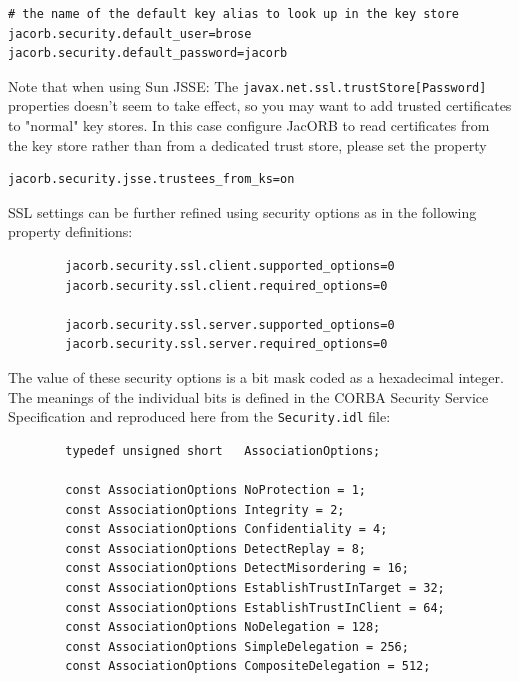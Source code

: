 \begin{verbatim}
# the name of the default key alias to look up in the key store
jacorb.security.default_user=brose
jacorb.security.default_password=jacorb
\end{verbatim}

Note that when using Sun JSSE: The {\tt javax.net.ssl.trustStore[Password]}
properties doesn't seem to take effect, so you may want to add trusted
certificates to "normal" key stores. In this case configure JacORB to read
certificates from the key store rather than from a dedicated trust
store, please set the property
\begin{verbatim} 
jacorb.security.jsse.trustees_from_ks=on
\end{verbatim}

SSL settings can be further refined using security options as in
the following property definitions:

\begin{verbatim}
        jacorb.security.ssl.client.supported_options=0
        jacorb.security.ssl.client.required_options=0

        jacorb.security.ssl.server.supported_options=0
        jacorb.security.ssl.server.required_options=0
\end{verbatim}

The  value  of  these security  options  is  a  bit  mask coded  as  a
hexadecimal integer. The meanings of the individual bits is defined in
the CORBA Security Service  Specification and reproduced here from the
{\tt Security.idl} file:

\begin{verbatim}
        typedef unsigned short   AssociationOptions;

        const AssociationOptions NoProtection = 1;
        const AssociationOptions Integrity = 2;
        const AssociationOptions Confidentiality = 4;
        const AssociationOptions DetectReplay = 8;
        const AssociationOptions DetectMisordering = 16;
        const AssociationOptions EstablishTrustInTarget = 32;
        const AssociationOptions EstablishTrustInClient = 64;
        const AssociationOptions NoDelegation = 128;
        const AssociationOptions SimpleDelegation = 256;
        const AssociationOptions CompositeDelegation = 512;
\end{verbatim}


